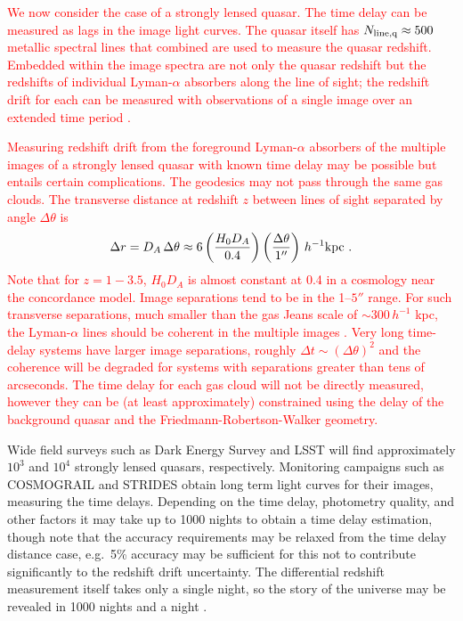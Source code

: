 \documentclass[preprint2, 10pt]{aastex}
\newcommand{\be}{\begin{equation}}
\newcommand{\ee}{\end{equation}}
\begin{document}
\textcolor{red}{
We now consider the case of a strongly lensed quasar.  The time delay can
be measured as lags in the image light curves.  The quasar itself has
$N_{\rm line,q} \approx 500$ metallic spectral lines 
\citep{2008MNRAS.386.1192L} that combined are used to measure the quasar
redshift.  Embedded within the image spectra are not only the quasar redshift but 
the redshifts of individual Lyman-$\alpha$ absorbers along the line of sight; the redshift drift for each can
be measured 
with observations of a single image
over an extended time period
\citep{1998ApJ...499L.111L,2008MNRAS.386.1192L}.}

\textcolor{red}{
Measuring redshift drift from the foreground Lyman-$\alpha$ absorbers of the multiple images
of a strongly lensed quasar with known time delay
may be possible but entails certain complications. 
The geodesics may not pass through the same gas clouds.
The transverse distance at redshift $z$ between 
lines of sight separated by angle $\Delta\theta$ is 
\be 
\Delta r=D_A\,\Delta\theta\approx 
6\left(\frac{H_0D_A}{0.4}\right)\left(\frac{\Delta\theta}{1''}\right)\, 
h^{-1}{\rm kpc} \ . 
\ee 
Note that for $z=1-3.5$, $H_0D_A$ is almost constant at 0.4 in a 
cosmology near the concordance model.  Image separations tend to be in 
the 1--$5''$ range.  For such transverse separations, much smaller than 
the gas Jeans scale of $\sim300\,h^{-1}$ kpc, the Lyman-$\alpha$ lines 
should be coherent in the multiple images \citep{09100250}.  
Very long time-delay systems have larger image separations, roughly 
$\Delta t\sim(\Delta\theta)^2$ and the coherence will be degraded for 
systems with separations greater than tens of arcseconds. 
The time delay for each gas cloud will not be directly measured, however they
can be (at least approximately) constrained using the delay
of the background quasar and the Friedmann-Robertson-Walker geometry. 
}

Wide field surveys such as Dark Energy Survey and LSST will find 
approximately $10^3$ and $10^4$ strongly lensed quasars, respectively.  
Monitoring 
campaigns such as COSMOGRAIL \citep{cosmograil} and STRIDES \citep{strides} 
obtain long term light curves for their images, measuring the time 
delays.  Depending on the time delay, photometry quality, and other 
factors it may take up to 1000 nights to obtain a time delay 
estimation, though note that the accuracy requirements may be relaxed 
from the time delay distance case, e.g.\ 5\% accuracy may be sufficient 
for this not to contribute significantly to the redshift drift uncertainty. 
The differential redshift measurement itself takes only a single night, 
so the story of the universe may be revealed in 1000 nights and a night 
\citep{1001}. 
\end{document}
